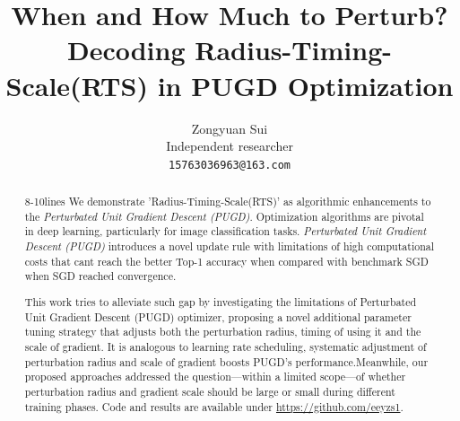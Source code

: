 \documentclass[10pt,twocolumn,letterpaper]{article}
\newcommand{\todo}[1]{\textcolor{red}{#1}}
\begin{document}
\setlength{\abovedisplayskip}{5pt}
\setlength{\belowdisplayskip}{5pt}
\setlength{\abovedisplayskip}{5pt}
\setlength{\belowdisplayskip}{5pt}


\title{When and How Much to Perturb? Decoding Radius-Timing-Scale(RTS) in PUGD Optimization}

\author{Zongyuan Sui\\
Independent researcher\\
{\tt\small 15763036963@163.com}
}

\maketitle
\thispagestyle{empty}

\begin{abstract} 8-10lines
We demonstrate 'Radius-Timing-Scale(RTS)' as algorithmic enhancements to the \textit{Perturbated Unit Gradient Descent (PUGD)}.
Optimization algorithms are pivotal in deep learning, particularly for image classification tasks. \textit{Perturbated Unit Gradient Descent (PUGD)} \cite{Tseng_2022} introduces a novel update rule with limitations of high computational costs that cant reach the better Top-1 accuracy when compared with benchmark SGD when SGD reached convergence. 

This work tries to alleviate such gap by investigating the limitations of Perturbated Unit Gradient Descent (PUGD) optimizer, proposing a novel additional parameter tuning strategy that adjusts both the perturbation radius, timing of using it and the scale of gradient. It is analogous to learning rate scheduling, systematic adjustment of perturbation radius and scale of gradient boosts PUGD's performance.Meanwhile, our proposed approaches addressed the question—within a limited scope—of whether perturbation radius and gradient scale should be large or small during different training phases. Code and results are available under \url{https://github.com/eeyzs1}.
\end{abstract}
\vspace{-1.25em}

\end{document}
